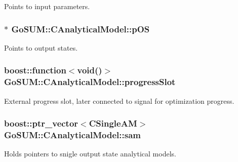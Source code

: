 Points to input parameters. 

\hypertarget{class_go_s_u_m_1_1_c_analytical_model_adc7b8239bc679f97800d0165d15e83f0}{
\subsubsection[{p\-O\-S}]{$\ast$ Go\-S\-U\-M\-::\-C\-Analytical\-Model\-::p\-O\-S\hspace{0.3cm}{\ttfamily [private]}}}\label{class_go_s_u_m_1_1_c_analytical_model_adc7b8239bc679f97800d0165d15e83f0}


Points to output states. 

\hypertarget{class_go_s_u_m_1_1_c_analytical_model_a1a7e0234d76dda2a15b99c95b6b81d4f}{
\subsubsection[{progress\-Slot}]{\setlength{\rightskip}{0pt plus 5cm}boost\-::function$<$void()$>$ Go\-S\-U\-M\-::\-C\-Analytical\-Model\-::progress\-Slot}}\label{class_go_s_u_m_1_1_c_analytical_model_a1a7e0234d76dda2a15b99c95b6b81d4f}


External progress slot, later connected to signal for optimization progress. 

\hypertarget{class_go_s_u_m_1_1_c_analytical_model_a032842ab4f4464dbefed384088ed754e}{
\subsubsection[{sam}]{\setlength{\rightskip}{0pt plus 5cm}boost\-::ptr\-\_\-vector$<${\bf C\-Single\-A\-M}$>$ Go\-S\-U\-M\-::\-C\-Analytical\-Model\-::sam\hspace{0.3cm}{\ttfamily [private]}}}\label{class_go_s_u_m_1_1_c_analytical_model_a032842ab4f4464dbefed384088ed754e}


Holds pointers to snigle output state analytical models. 

